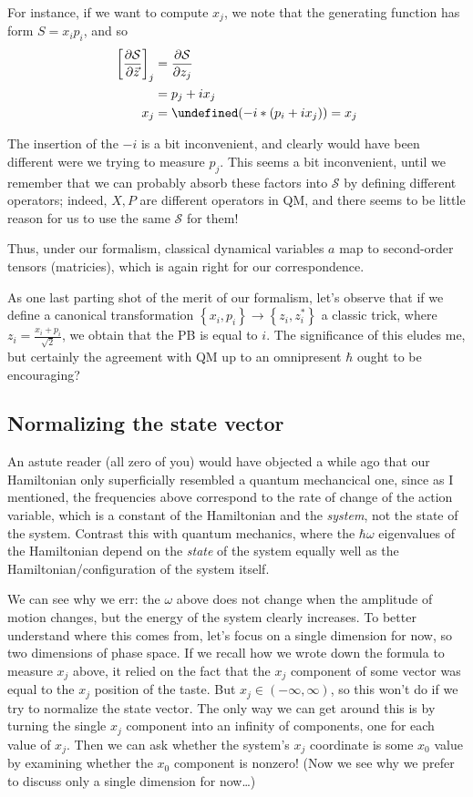 \documentclass[10pt]{article}
\newcommand{\pd}[2]{\frac{\partial#1}{\partial#2}}
\let\Re\undefined
\DeclareMathOperator{\Re}{Re}
\begin{document}
For instance, if we want to compute $x_j$, we note that the generating function
has form $S = x_ip_i$, and so
\begin{align}
    \left[ \pd{\mathcal{S}}{\vec{z}} \right]_j &= \pd{\mathcal{S}}{z_j}\\
    &= p_j + ix_j\\
    x_j &= \Re(-i * (p_i + ix_j)) = x_j
\end{align}

The insertion of the $-i$ is a bit inconvenient, and clearly would have been
different were we trying to measure $p_j$. This seems a bit inconvenient, until
we remember that we can probably absorb these factors into $\mathcal{S}$ by
defining different operators; indeed, $X,P$ are different operators in QM, and
there seems to be little reason for us to use the same $\mathcal{S}$ for them!

Thus, under our formalism, classical dynamical variables $a$ map to second-order
tensors (matricies), which is again right for our correspondence.

As one last parting shot of the merit of our formalism, let's observe that if we
define a canonical transformation $\left\{ x_i, p_i \right\} \to \left\{ z_i,
z_i^* \right\}$ a classic trick, where $z_i = \frac{x_i + p_i}{\sqrt{2}}$, we
obtain that the PB is equal to $i$. The significance of this eludes me, but
certainly the agreement with QM up to an omnipresent $\hbar$ ought to be
encouraging?


\subsection{Normalizing the state vector}

An astute reader (all zero of you) would have objected a while ago that our
Hamiltonian only superficially resembled a quantum mechancical one, since as I
mentioned, the frequencies above correspond to the rate of change of the action
variable, which is a constant of the Hamiltonian and the \emph{system}, not the
state of the system. Contrast this with quantum mechanics, where the $\hbar
\omega$ eigenvalues of the Hamiltonian depend on the \emph{state} of the system
equally well as the Hamiltonian/configuration of the system itself.

We can see why we err: the $\omega$ above does not change when the amplitude of
motion changes, but the energy of the system clearly increases. To better
understand where this comes from, let's focus on a single dimension for now, so
two dimensions of phase space. If we recall how we wrote down the formula to
measure $x_j$ above, it relied on the fact that the $x_j$ component of some
vector was equal to the $x_j$ position of the taste. But $x_j \in \left(
-\infty,\infty \right)$, so this won't do if we try to normalize the state
vector. The only way we can get around this is by turning the single $x_j$
component into an infinity of components, one for each value of $x_j$. Then we
can ask whether the system's $x_j$ coordinate is some $x_0$ value by examining
whether the $x_0$ component is nonzero! (Now we see why we prefer to discuss
only a single dimension for now\dots)
\end{document}
